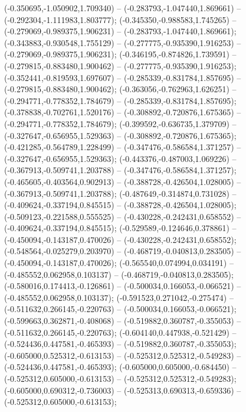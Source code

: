  (-0.350695,-1.050902,1.709340) -- (-0.283793,-1.047440,1.869661) -- (-0.292304,-1.111983,1.803777);
 (-0.345350,-0.988583,1.745265) -- (-0.279069,-0.989375,1.906231) -- (-0.283793,-1.047440,1.869661);
 (-0.343883,-0.930548,1.755129) -- (-0.277775,-0.935390,1.916253) -- (-0.279069,-0.989375,1.906231);
 (-0.346195,-0.874826,1.739591) -- (-0.279815,-0.883480,1.900462) -- (-0.277775,-0.935390,1.916253);
 (-0.352441,-0.819593,1.697607) -- (-0.285339,-0.831784,1.857695) -- (-0.279815,-0.883480,1.900462);
 (-0.363056,-0.762963,1.626251) -- (-0.294771,-0.778352,1.784679) -- (-0.285339,-0.831784,1.857695);
 (-0.378838,-0.702761,1.520176) -- (-0.308892,-0.720876,1.675365) -- (-0.294771,-0.778352,1.784679);
 (-0.399592,-0.636735,1.379709) -- (-0.327647,-0.656955,1.529363) -- (-0.308892,-0.720876,1.675365);
 (-0.421285,-0.564789,1.228499) -- (-0.347476,-0.586584,1.371257) -- (-0.327647,-0.656955,1.529363);
 (-0.443376,-0.487003,1.069226) -- (-0.367913,-0.509741,1.203788) -- (-0.347476,-0.586584,1.371257);
 (-0.465605,-0.403564,0.902913) -- (-0.388728,-0.426504,1.028005) -- (-0.367913,-0.509741,1.203788);
 (-0.487649,-0.314874,0.731028) -- (-0.409624,-0.337194,0.845515) -- (-0.388728,-0.426504,1.028005);
 (-0.509123,-0.221588,0.555525) -- (-0.430228,-0.242431,0.658552) -- (-0.409624,-0.337194,0.845515);
 (-0.529589,-0.124646,0.378861) -- (-0.450094,-0.143187,0.470026) -- (-0.430228,-0.242431,0.658552);
 (-0.548564,-0.025279,0.203970) -- (-0.468719,-0.040813,0.283505) -- (-0.450094,-0.143187,0.470026);
 (-0.565540,0.074994,0.034191) -- (-0.485552,0.062958,0.103137) -- (-0.468719,-0.040813,0.283505);
 (-0.580016,0.174413,-0.126861) -- (-0.500034,0.166053,-0.066521) -- (-0.485552,0.062958,0.103137);
 (-0.591523,0.271042,-0.275474) -- (-0.511632,0.266145,-0.220763) -- (-0.500034,0.166053,-0.066521);
 (-0.599663,0.362871,-0.408068) -- (-0.519882,0.360787,-0.355053) -- (-0.511632,0.266145,-0.220763);
 (-0.604140,0.447938,-0.521429) -- (-0.524436,0.447581,-0.465393) -- (-0.519882,0.360787,-0.355053);
 (-0.605000,0.525312,-0.613153) -- (-0.525312,0.525312,-0.549283) -- (-0.524436,0.447581,-0.465393);
 (-0.605000,0.605000,-0.684450) -- (-0.525312,0.605000,-0.613153) -- (-0.525312,0.525312,-0.549283);
 (-0.605000,0.690312,-0.736003) -- (-0.525313,0.690313,-0.659336) -- (-0.525312,0.605000,-0.613153);
